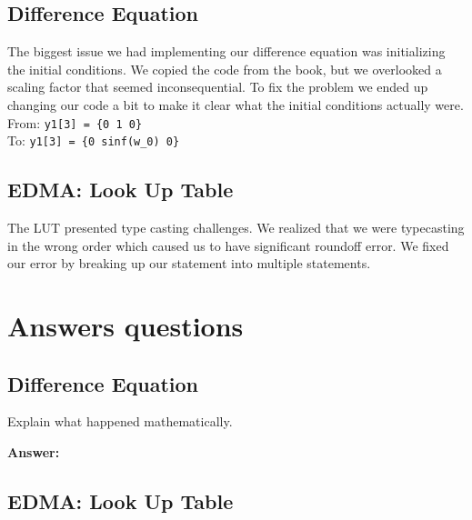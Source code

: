 \documentclass{article}
\begin{document}
\subsection{Difference Equation}

The biggest issue we had implementing our difference equation was initializing the initial conditions.
We copied the code from the book, but we overlooked a scaling factor that seemed inconsequential.
To fix the problem we ended up changing our code a bit to make it clear what the initial conditions actually were. \\

From: \verb|y1[3] = {0 1 0}| \\
To: \verb|y1[3] = {0 sinf(w_0) 0}|

\subsection{EDMA: Look Up Table}

The LUT presented type casting challenges.
We realized that we were typecasting in the wrong order which caused us to have significant roundoff error.
We fixed our error by breaking up our statement into multiple statements.


\section{Answers questions}

\subsection{Difference Equation}

\begin{enumerate}
  \begin{item}
    Explain what happened mathematically.

  \textbf{Answer:}

  \end{item}
\end{enumerate}

\subsection{EDMA: Look Up Table}
\end{document}
